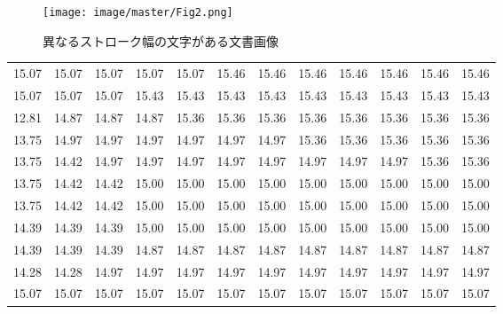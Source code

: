 \documentclass[uplatex, twocolumn,10pt]{jsarticle}
\begin{document}













\begin{figure}[tp]
    \begin{center}
        \texttt{[image: image/master/Fig2.png]}
        \caption{異なるストローク幅の文字がある文書画像}
        \label{fig2}
    \end{center}
\end{figure}



\begin{table*}[tp]
    \centering
    \caption{図\ref{fig2}のaにおけるストローク幅変換行列の値}
    \label{table1}
    \begin{tabular}{cccccccccccc}
        \hline
        15.07 & 15.07 & 15.07 & 15.07 & 15.07 & 15.46 & 15.46 & 15.46 & 15.46 & 15.46 & 15.46 & 15.46 \\
        15.07 & 15.07 & 15.07 & 15.43 & 15.43 & 15.43 & 15.43 & 15.43 & 15.43 & 15.43 & 15.43 & 15.43 \\
        12.81 & 14.87 & 14.87 & 14.87 & 15.36 & 15.36 & 15.36 & 15.36 & 15.36 & 15.36 & 15.36 & 15.36 \\
        13.75 & 14.97 & 14.97 & 14.97 & 14.97 & 14.97 & 14.97 & 15.36 & 15.36 & 15.36 & 15.36 & 15.36 \\
        13.75 & 14.42 & 14.97 & 14.97 & 14.97 & 14.97 & 14.97 & 14.97 & 14.97 & 14.97 & 15.36 & 15.36 \\
        13.75 & 14.42 & 14.42 & 15.00 & 15.00 & 15.00 & 15.00 & 15.00 & 15.00 & 15.00 & 15.00 & 15.00 \\
        13.75 & 14.42 & 14.42 & 15.00 & 15.00 & 15.00 & 15.00 & 15.00 & 15.00 & 15.00 & 15.00 & 15.00 \\
        14.39 & 14.39 & 14.39 & 15.00 & 15.00 & 15.00 & 15.00 & 15.00 & 15.00 & 15.00 & 15.00 & 15.00 \\
        14.39 & 14.39 & 14.39 & 14.87 & 14.87 & 14.87 & 14.87 & 14.87 & 14.87 & 14.87 & 14.87 & 14.87 \\
        14.28 & 14.28 & 14.97 & 14.97 & 14.97 & 14.97 & 14.97 & 14.97 & 14.97 & 14.97 & 14.97 & 14.97 \\
        15.07 & 15.07 & 15.07 & 15.07 & 15.07 & 15.07 & 15.07 & 15.07 & 15.07 & 15.07 & 15.07 & 15.07 \\

\end{tabular}
\end{table*}
\end{document}
